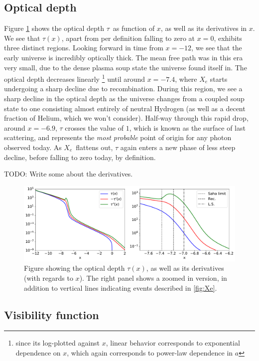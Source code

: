 \documentclass[10pt, a4paper]{article}
\begin{document}
\subsection{Optical depth}
Figure \ref{fig:tau} shows the optical depth $\tau$ as function of $x$, as well as its derivatives in $x$. We see that $\tau(x)$, apart from per definition falling to zero at $x=0$, exhibits three distinct regions. Looking forward in time from $x=-12$, we see that the early universe is incredibly optically thick. The mean free path was in this era very small, due to the dense plasma soup state the universe found itself in. The optical depth decreases linearly \footnote{since its log-plotted against $x$, linear behavior corresponds to exponential dependence on $x$, which again corresponds to power-law dependence in $a$} until around $x=-7.4$, where $X_e$ starts undergoing a sharp decline due to recombination. During this region, we see a sharp decline in the optical depth as the universe changes from a coupled soup state to one consisting almost entirely of neutral Hydrogen (as well as a decent fraction of Helium, which we won't consider). Half-way through this rapid drop, around $x=-6.9$, $\tau$ crosses the value of $1$, which is known as the surface of last scattering, and represents the \textit{most probable} point of origin for any photon observed today. As $X_e$ flattens out, $\tau$ again enters a new phase of less steep decline, before falling to zero today, by definition.

TODO: Write some about the derivatives.


\begin{figure}[H]
    \centering
    \includegraphics[scale=0.5]{../m2_figs/tau.pdf}
    \caption{Figure showing the optical depth $\tau(x)$, as well as its derivatives (with regards to $x$). The right panel shows a zoomed in version, in addition to vertical lines indicating events described in \ref{fig:Xe}.}
    \label{fig:tau}
\end{figure}


\subsection{Visibility function}\label{sec:results:g_tilde}
\end{document}

